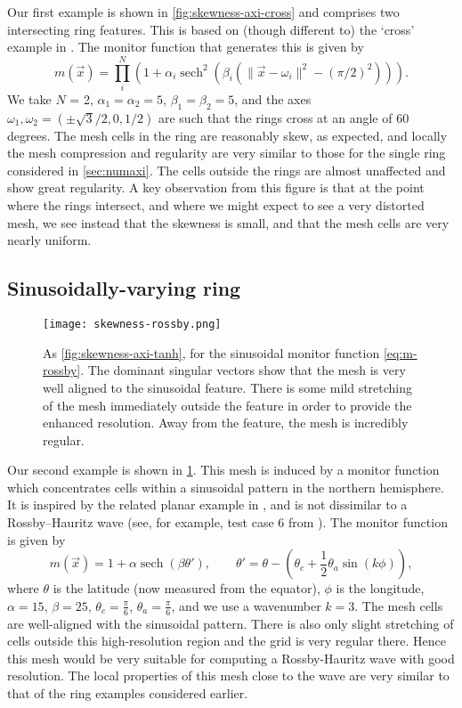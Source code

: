 \documentclass[11pt, a4paper]{scrartcl}  %
\theoremstyle{plain}
\theoremstyle{definition}
\numberwithin{equation}{section}
\DeclareMathOperator{\sech}{sech}
\begin{document}
Our first example is shown in \cref{fig:skewness-axi-cross} and
comprises two intersecting ring features. This is based on (though
different to) the `cross' example in \citet{mcrae2018optimal}.
The monitor function that generates this is given by
\begin{equation}
\label{eq:m-cross}
  m(\vec{x}) = \prod_i^N \left(1 + \alpha_i \sech^2(\beta_i ( \|\vec{x} - \omega_i\|^2  - (\pi/2)^2))\right).
\end{equation}
We take $N$ = 2, $\alpha_1 = \alpha_2 = 5$, $\beta_1 = \beta_2 = 5$,
and the axes $\omega_1, \omega_2 = (\pm \sqrt{3}/2,0,1/2)$ are such that
the rings cross at an angle of 60 degrees. The mesh cells in the ring
are reasonably skew, as expected, and locally the mesh compression and
regularity are very similar to those for the single ring considered in
\cref{sec:numaxi}. The cells outside the rings are almost unaffected and
show great regularity. A key observation from this figure is that at the
point where the rings intersect, and where we might expect to see a very
distorted mesh, we see instead that the skewness is small, and that the mesh cells are very nearly
uniform. 

\subsection{Sinusoidally-varying ring}

\begin{figure}[!tb]
  \centering
  \texttt{[image: skewness-rossby.png]}
  \caption{As \cref{fig:skewness-axi-tanh}, for the sinusoidal monitor
function \cref{eq:m-rossby}. The dominant singular vectors show that the
mesh is very well aligned to the sinusoidal feature. There is some mild
stretching of the mesh immediately outside the feature in order to
provide the enhanced resolution. Away from the feature, the mesh is
incredibly regular.}
\label{fig:skewness-axi-rossby}
\end{figure}

Our second example is shown in \cref{fig:skewness-axi-rossby}. This mesh
is induced by a monitor function which concentrates cells within a
sinusoidal pattern in the northern hemisphere. It is inspired by the
related planar example in \citet{budd2015geometry}, and is not
dissimilar to a Rossby--Hauritz wave (see, for example, test case 6 from
\citet{williamson1992standard}). The monitor function is given by
\begin{equation}
\label{eq:m-rossby}
  m(\vec{x}) = 1 + \alpha\sech(\beta\theta'),\qquad
  \theta' = \theta - (\theta_c + \frac{1}{2}\theta_a\sin(k\phi)),
\end{equation}
where $\theta$ is the latitude (now measured from the equator), $\phi$
is the longitude, $\alpha = 15$, $\beta = 25$, $\theta_c = \frac{\pi}{6}$,
$\theta_a = \frac{\pi}{6}$, and we use a wavenumber $k = 3$. The mesh
cells are well-aligned with the sinusoidal pattern. There is also only
slight stretching of cells outside this high-resolution region and the
grid is very regular there. Hence this mesh would be very suitable for
computing a Rossby-Hauritz wave with good resolution. The local
properties of this mesh close to the wave are very similar to that of
the ring examples considered earlier.
\end{document}
